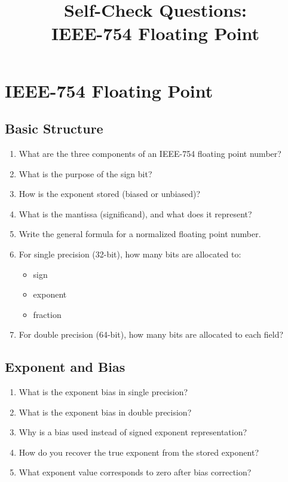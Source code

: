 \documentclass{self-check}
\title{Self-Check Questions:\\IEEE-754 Floating Point}
\author{}
\date{}
\begin{document}
\maketitle

\section{IEEE-754 Floating Point}

\subsection{Basic Structure}

\begin{enumerate}
  \item What are the three components of an IEEE-754 floating point number?
  \item What is the purpose of the sign bit?
  \item How is the exponent stored (biased or unbiased)?
  \item What is the mantissa (significand), and what does it represent?
  \item Write the general formula for a normalized floating point number.
  \item For single precision (32-bit), how many bits are allocated to:
    \begin{itemize}
      \item sign
      \item exponent
      \item fraction
    \end{itemize}
  \item For double precision (64-bit), how many bits are allocated to each field?
\end{enumerate}

\subsection{Exponent and Bias}

\begin{enumerate}
  \item What is the exponent bias in single precision?
  \item What is the exponent bias in double precision?
  \item Why is a bias used instead of signed exponent representation?
  \item How do you recover the true exponent from the stored exponent?
  \item What exponent value corresponds to zero after bias correction?
\end{enumerate}
\end{document}
